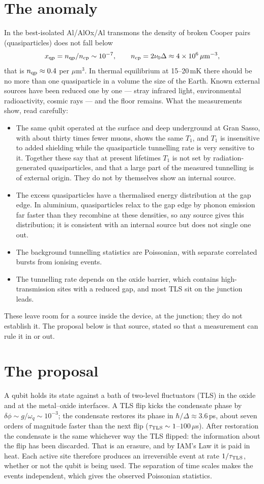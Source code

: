 \section{The anomaly}
In the best-isolated Al/AlOx/Al transmons the density of broken Cooper pairs (quasiparticles) does not fall below
\begin{equation}x_{\rm qp}=n_{\rm qp}/n_{\rm cp}\sim10^{-7},\qquad n_{\rm cp}=2\nu_0\Delta\approx4\times10^6\,\mu{\rm m}^{-3},\end{equation}
that is $n_{\rm qp}\approx0.4$ per $\mu$m$^3$. In thermal equilibrium at 15--20\,mK there should be no more than one quasiparticle in a volume the size
of the Earth. Known external sources have been reduced one by one --- stray infrared light, environmental radioactivity, cosmic rays --- and the floor
remains. What the measurements show, read carefully:
\begin{itemize}
\item The same qubit operated at the surface and deep underground at Gran Sasso, with about thirty times fewer muons, shows the same $T_1$, and
$T_1$ is insensitive to added shielding while the quasiparticle tunnelling rate is very sensitive to it. Together these say that at present
lifetimes $T_1$ is not set by radiation-generated quasiparticles, and that a large part of the measured tunnelling is of external origin. They do not
by themselves show an internal source.
\item The excess quasiparticles have a thermalised energy distribution at the gap edge. In aluminium, quasiparticles relax to the gap edge by phonon
emission far faster than they recombine at these densities, so any source gives this distribution; it is consistent with an internal source but does
not single one out.
\item The background tunnelling statistics are Poissonian, with separate correlated bursts from ionising events.
\item The tunnelling rate depends on the oxide barrier, which contains high-transmission sites with a reduced gap, and most TLS sit on the junction leads.
\end{itemize}
These leave room for a source inside the device, at the junction; they do not establish it. The proposal below is that source, stated so that a
measurement can rule it in or out.

\section{The proposal}
A qubit holds its state against a bath of two-level fluctuators (TLS) in the oxide and at the metal--oxide interfaces. A TLS flip kicks the condensate
phase by $\delta\phi\sim g/\omega_q\sim10^{-3}$; the condensate restores its phase in $\hbar/\Delta\approx3.6$\,ps, about seven orders of magnitude faster than
the next flip ($\tau_{\rm TLS}\sim1$--$100\,\mu$s). After restoration the condensate is the same whichever way the TLS flipped: the information about
the flip has been discarded. That is an erasure, and by IAM's Law it is paid in heat. Each active site therefore produces an irreversible event at rate
$1/\tau_{\rm TLS}$, whether or not the qubit is being used. The separation of time scales makes the events independent, which gives the observed
Poissonian statistics.
